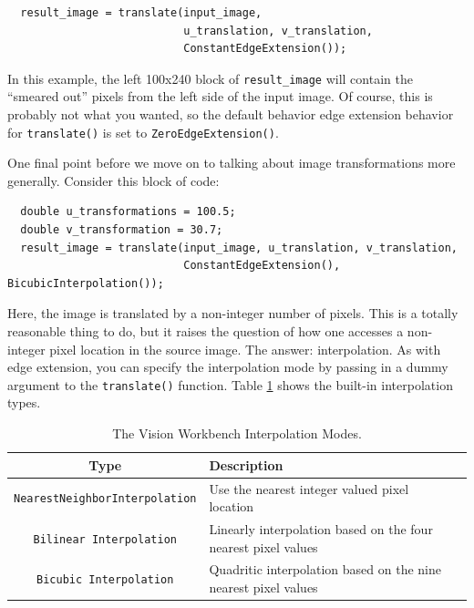 \begin{verbatim} 
  result_image = translate(input_image, 
                           u_translation, v_translation, 
                           ConstantEdgeExtension());
\end{verbatim}

In this example, the left 100x240 block of \verb#result_image# will contain
the ``smeared out'' pixels from the left side of the input image.  Of
course, this is probably not what you wanted, so the default behavior
edge extension behavior for \verb#translate()# is set to
\verb#ZeroEdgeExtension()#.

One final point before we move on to talking about image
transformations more generally.  Consider this block of code:

\begin{verbatim} 
  double u_transformations = 100.5;
  double v_transformation = 30.7;
  result_image = translate(input_image, u_translation, v_translation, 
                           ConstantEdgeExtension(), BicubicInterpolation());
\end{verbatim}

Here, the image is translated by a non-integer number of pixels.  This
is a totally reasonable thing to do, but it raises the question of how
one accesses a non-integer pixel location in the source image.  The
answer: interpolation.  As with edge extension, you can
specify the interpolation mode by passing in a dummy argument to the
\verb#translate()# function.  Table \ref{tbl:interpolation-modes}
shows the built-in interpolation types.

\begin{table}[t]\begin{centering}
\begin{tabular}{|c|l|l|} \hline
Type & Description \\ \hline \hline
\verb#NearestNeighborInterpolation# & Use the nearest integer valued pixel location \\ \hline
\verb#Bilinear Interpolation# & Linearly interpolation based on the four nearest pixel values \\ \hline
\verb#Bicubic Interpolation# & Quadritic interpolation based on the nine nearest pixel values \\ \hline
\end{tabular}
\caption{The Vision Workbench Interpolation Modes.}
\label{tbl:interpolation-modes}
\end{centering}\end{table}

